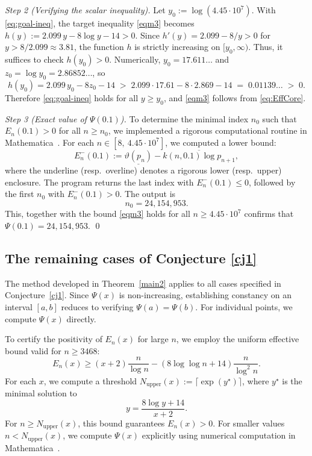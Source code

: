 \documentclass[10pt]{amsart}
\theoremstyle{definition} %
\numberwithin{equation}{section}
\begin{document}
\medskip
\noindent\textit{Step 2 (Verifying the scalar inequality).}
Let $y_0:=\log(4.45\cdot 10^{7})$. With \eqref{eq:goal-ineq}, the target inequality
\eqref{eqm3} becomes $h(y):=2.099\,y - 8\log y - 14>0$.
Since $h'(y)=2.099 - 8/y>0$ for $y>8/2.099\approx 3.81$, the function $h$ is
strictly increasing on $[y_0,\infty)$.
Thus, it suffices to check $h(y_0)>0$. Numerically,
$y_0=17.611\ldots$ and $z_0=\log y_0=2.86852\ldots$, so
\[
h(y_0)=2.099\,y_0-8 z_0-14 \;>\; 2.099\cdot 17.61 - 8\cdot 2.869 - 14
\;=\; 0.01139\ldots\;>\;0.
\]
Therefore \eqref{eq:goal-ineq} holds for all $y\ge y_0$, and \eqref{eqm3}
follows from \eqref{eq:EffCore}.

\medskip
\noindent\textit{Step 3 (Exact value of $\Psi(0.1)$).}
To determine the minimal index $n_0$ such that $E_n(0.1) > 0$ for all $n \geq n_0$, 
we implemented a rigorous computational routine in \textsf{Mathematica}~\cite{wolfram2023}. 
For each $n\in [8,\ 4.45\cdot 10^7]$, we computed a lower bound:
\[
E_n^{-}(0.1):=\underline{\vartheta(p_n)}-\overline{k(n,0.1)\log p_{n+1}},
\]
where the underline (resp.\ overline) denotes a rigorous lower (resp.\ upper)
enclosure. The program returns the last index with $E_n^{-}(0.1)\le 0$,
followed by the first $n_0$ with $E_n^{-}(0.1)>0$. The output is
\[
n_0=24{,}154{,}953.
\]
This, together with the bound
\eqref{eqm3} holds for all $n\ge 4.45\cdot 10^7$ confirms that $\Psi(0.1)=24{,}154{,}953$. 
\qed

\subsection{The remaining cases of Conjecture \ref{cj1}}

The method developed in Theorem~\ref{main2} applies to all cases specified in Conjecture~\ref{cj1}. Since $\Psi(x)$ is non-increasing, establishing constancy on an interval $[a, b]$ reduces to verifying $\Psi(a) = \Psi(b)$. For individual points, we compute $\Psi(x)$ directly.

To certify the positivity of $E_n(x)$ for large $n$, we employ the uniform effective bound valid for $n \geq 3468$:
\[
E_n(x) \geq (x+2)\frac{n}{\log n} - (8\log\log n + 14)\frac{n}{\log^2 n}.
\]
For each $x$, we compute a threshold $N_{\text{upper}}(x) := \lceil \exp(y^\star) \rceil$, where $y^\star$ is the minimal solution to
\[
y = \frac{8\log y + 14}{x+2}.
\]
For $n \geq N_{\text{upper}}(x)$, this bound guarantees $E_n(x) > 0$. For smaller values $n < N_{\text{upper}}(x)$, we compute $\Psi(x)$ explicitly using numerical computation in \textsf{Mathematica}~\cite{wolfram2023}.
\end{document}

